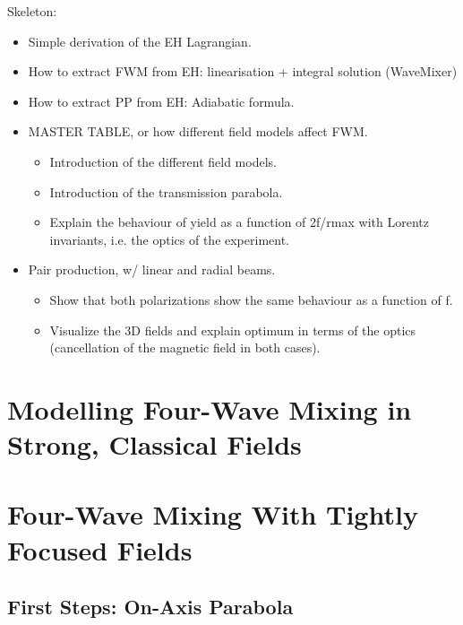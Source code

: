 \documentclass[11pt,SymmetricalJury]{inrsthesis/inrsthesis}
\begin{document}

Skeleton:
\begin{itemize}
    \item Simple derivation of the EH Lagrangian.
    \item How to extract FWM from EH: linearisation + integral solution (WaveMixer)
    \item How to extract PP from EH: Adiabatic formula.
    \item MASTER TABLE, or how different field models affect FWM.
      \begin{itemize}
        \item Introduction of the different field models.
        \item Introduction of the transmission parabola.
        \item Explain the behaviour of yield as a function of 2f/rmax with Lorentz invariants,
              i.e. the optics of the experiment.
      \end{itemize}
    \item Pair production, w/ linear and radial beams.
      \begin{itemize}
          \item Show that both polarizations show the same behaviour as a function of f.
          \item Visualize the 3D fields and explain optimum in terms of the optics (cancellation of the
                magnetic field in both cases).
      \end{itemize}
\end{itemize}

\section{Modelling Four-Wave Mixing in Strong, Classical Fields}

\section{Four-Wave Mixing With Tightly Focused Fields}

\subsection{First Steps: On-Axis Parabola}

\end{document}
